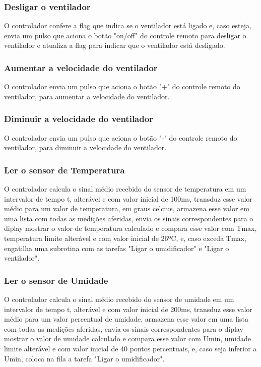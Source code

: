 \documentclass[conference]{IEEEtran}
\begin{document}
\subsubsection{Desligar o ventilador}
O controlador confere a flag que indica se o ventilador está ligado e, caso esteja, envia um pulso que aciona o botão "on/off" do controle remoto para desligar o ventilador e atualiza a flag para indicar que o ventilador está desligado.

\subsubsection{Aumentar a velocidade do ventilador}
O controlador envia um pulso que aciona o botão "+" do controle remoto do ventilador, para aumentar a velocidade do ventilador.

\subsubsection{Diminuir a velocidade do ventilador}
O controlador envia um pulso que aciona o botão "-" do controle remoto do ventilador, para diminuir a velocidade do ventilador.

\subsubsection{Ler o sensor de Temperatura}
O controlador calcula o sinal médio recebido do sensor de temperatura em um intervalor de tempo t, alterável e com valor inicial de 100ms, transduz esse valor médio para um valor de temperatura, em graus celcius, armazena esse valor em uma lista com todas as medições aferidas, envia os sinais correspondentes para o diplay mostrar o valor de temperatura calculado e compara esse valor com Tmax, temperatura limite alterável e com valor inicial de 26ºC, e, caso exceda Tmax, engatilha uma subrotina com as tarefas "Ligar o umidificador" e "Ligar o ventilador".

\subsubsection{Ler o sensor de Umidade}
O controlador calcula o sinal médio recebido do sensor de umidade em um intervalor de tempo t, alterável e com valor inicial de 200ms, transduz esse valor médio para um valor percentual de umidade, armazena esse valor em uma lista com todas as medições aferidas, envia os sinais correspondentes para o diplay mostrar o valor de umidade calculado e compara esse valor com Umin, umidade limite alterável e com valor inicial de 40 pontos percentuais, e, caso seja inferior a Umin, coloca na fila a tarefa "Ligar o umidificador".
\end{document}
